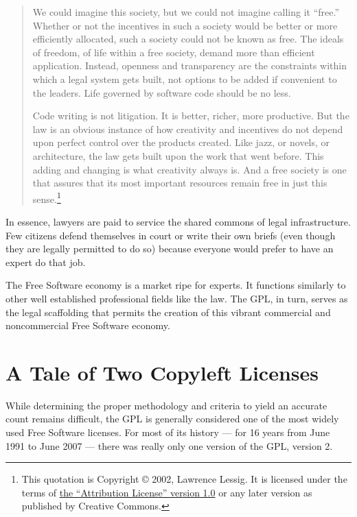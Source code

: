 \begin{quotation}
We could imagine this society, but we could not imagine calling it
``free.''  Whether or not the incentives in such a society would be better
or more efficiently allocated, such a society could not be known as free.
The ideals of freedom, of life within a free society, demand more than
efficient application.  Instead, openness and transparency are the
constraints within which a legal system gets built, not options to be
added if convenient to the leaders.  Life governed by software code should
be no less.

Code writing is not litigation.  It is better, richer, more
productive.  But the law is an obvious instance of how creativity and
incentives do not depend upon perfect control over the products
created.  Like jazz, or novels, or architecture, the law gets built
upon the work that went before. This adding and changing is what
creativity always is.  And a free society is one that assures that its
most important resources remain free in just this sense.\footnote{This
quotation is Copyright \copyright{} 2002, Lawrence Lessig. It is
licensed under the terms of
\href{http://creativecommons.org/licenses/by/1.0/}{the ``Attribution
License'' version 1.0} or any later version as published by Creative
Commons.}
\end{quotation}

In essence, lawyers are paid to service the shared commons of legal
infrastructure.  Few citizens defend themselves in court or write their
own briefs (even though they are legally permitted to do so) because
everyone would prefer to have an expert do that job.

The Free Software economy is a market ripe for experts.  It
functions similarly to other well established professional fields like the
law. The GPL, in turn, serves as the legal scaffolding that permits the
creation of this vibrant commercial and noncommercial Free Software
economy.

\chapter{A Tale of Two Copyleft Licenses}
\label{tale-of-two-copylefts}

While determining the proper methodology and criteria to yield an accurate
count remains difficult, the GPL is generally considered one of the most
widely used Free Software licenses.  For most of its history --- for 16 years
from June 1991 to June 2007 --- there was really only one version of the GPL,
version 2.

